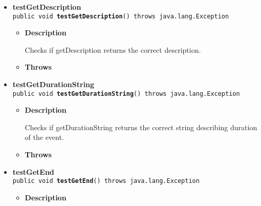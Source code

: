 \documentclass[11pt,a4paper]{report}
\begin{document}
{{{\begin{itemize}
{\begin{itemize}
{Checks if getDateString returns the correct string describing date of the event.
}
\item{{\bf  Throws}
}%
\end{itemize}
}%
\item{ 
{\bf  testGetDescription}\\
\texttt{public void\ {\bf  testGetDescription}() throws java.lang.Exception
\label{is.mpg.ruglan.test.CalEventTest.testGetDescription()}}%
\begin{itemize}
\item{
{\bf  Description}

Checks if getDescription returns the correct description.
}
\item{{\bf  Throws}
}%
\end{itemize}
}%
\item{ 
{\bf  testGetDurationString}\\
\texttt{public void\ {\bf  testGetDurationString}() throws java.lang.Exception
\label{is.mpg.ruglan.test.CalEventTest.testGetDurationString()}}%
\begin{itemize}
\item{
{\bf  Description}

Checks if getDurationString returns the correct string describing duration of the event.
}
\item{{\bf  Throws}
}%
\end{itemize}
}%
\item{ 
{\bf  testGetEnd}\\
\texttt{public void\ {\bf  testGetEnd}() throws java.lang.Exception
\label{is.mpg.ruglan.test.CalEventTest.testGetEnd()}}%
\begin{itemize}
\item{
{\bf  Description}

}
\end{itemize}}
\end{itemize}}}}
\end{document}
